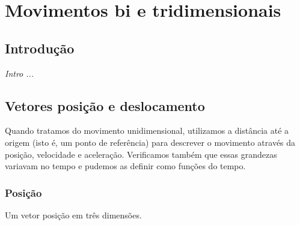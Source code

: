 \chapter{Movimentos bi e tridimensionais}
\label{Chap:MovimentoBidimensional}


\section{Introdução}

{\it
Intro ...
}

\section{Vetores posição e deslocamento}

Quando tratamos do movimento unidimensional, utilizamos a distância até a origem (isto é, um ponto de referência) para descrever o movimento através da posição, velocidade e aceleração. Verificamos também que essas grandezas variavam no tempo e pudemos as definir como funções do tempo.

\subsection{Posição}

\begin{marginfigure}
\centering
{}
\caption{Um vetor posição em três dimensões.}
\end{marginfigure}


